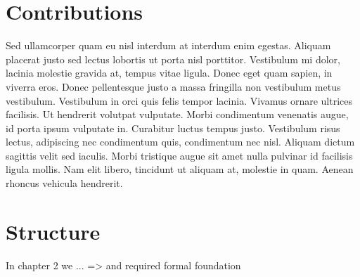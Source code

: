 \section{Contributions}

Sed ullamcorper quam eu nisl interdum at interdum enim egestas. Aliquam placerat justo sed lectus lobortis ut porta nisl porttitor. Vestibulum mi dolor, lacinia molestie gravida at, tempus vitae ligula. Donec eget quam sapien, in viverra eros. Donec pellentesque justo a massa fringilla non vestibulum metus vestibulum. Vestibulum in orci quis felis tempor lacinia. Vivamus ornare ultrices facilisis. Ut hendrerit volutpat vulputate. Morbi condimentum venenatis augue, id porta ipsum vulputate in. Curabitur luctus tempus justo. Vestibulum risus lectus, adipiscing nec condimentum quis, condimentum nec nisl. Aliquam dictum sagittis velit sed iaculis. Morbi tristique augue sit amet nulla pulvinar id facilisis ligula mollis. Nam elit libero, tincidunt ut aliquam at, molestie in quam. Aenean rhoncus vehicula hendrerit.

\section{Structure}
In chapter 2 we ... 
 => and required formal foundation
